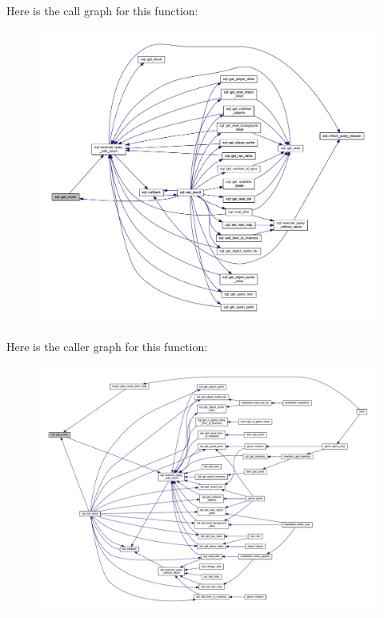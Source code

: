 Here is the call graph for this function\+:
\nopagebreak
\begin{figure}[H]
\begin{center}
\leavevmode
\includegraphics[width=350pt]{classsql_ae959c21f71c8f9b1df8bde932a6c484b_cgraph}
\end{center}
\end{figure}
Here is the caller graph for this function\+:
\nopagebreak
\begin{figure}[H]
\begin{center}
\leavevmode
\includegraphics[width=350pt]{classsql_ae959c21f71c8f9b1df8bde932a6c484b_icgraph}
\end{center}
\end{figure}
\mbox{\label{classsql_a7b49bcf5ac10f6421a5ecd62865e3316}} 
